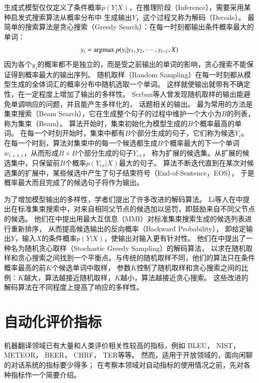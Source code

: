 生成式模型仅仅定义了条件概率$p(Y|X)$，在推理阶段（Inference），需要采用某种启发式搜索算法从概率分布中
生成输出$Y$，这个过程又称为解码（Decode）。
最简单的搜索算法是贪心搜索（Greedy Search）：在每一时刻都输出条件概率最大的单词：
\begin{align}
    y_i = \operatorname*{argmax} p(y_i|y_1, y_2, \cdots, y_{i-1}, X)
\end{align}
因为各个$y_i$的概率都不是独立的，而是受之前输出的单词的影响，贪心搜索不能保证得到概率最大的输出序列。
随机取样（Random Sampling）在每一时刻都从模型生成的全体词汇的概率分布中随机选取一个单词。
这样就使输出就带有不确定性，在一定程度上增加了输出的多样性。
Serban等人曾发现随机取样的输出能避免单调响应的问题，并且能产生多样化的，
话题相关的输出。
最为常用的方法是集束搜索（Beam Search），它在生成整个句子的过程中维护一个大小为$B$的列表，称为集束（Beam）。
算法开始时，集束初始化为模型生成的$B$个概率最高的单词。
在每一个时刻开始时，集束中都有$B$个部分生成的句子，它们称为候选$Y_c$。
在每一个时刻，算法对集束中的每一个候选都生成$B$个概率最大的下一个单词$w_{i+1, c}$，从而形成$B \times B$个部分生成的句子$Y_{ex}$，
称为扩展的候选集。从扩展的候选集中，只保留前$B$个概率$p(Y_{ex}|X)$最大的句子。
算法不断迭代直到在某次对候选集的扩展中，某些候选中产生了句子结束符号（End-of-Sentence，EOS），
于是概率最大而且完成了的候选句子将作为输出。

为了增加模型输出的多样性，学者们提出了许多改进的解码算法。
Li等人在\cite{DiverseBeam}中提出在标准集束搜索中，对来自相同父节点的候选加以惩罚，即鼓励来自不同父节点的候选。
他们在\cite{MMI}中提出用最大互信息（MMI）对标准集束搜索生成的候选列表进行重新排序，
从而提高候选输出的反向概率（Backward Probability），
即给定输出$Y$，输入$X$的条件概率$p(Y|X)$，使输出对输入更有针对性。
他们在\cite{Distill}中提出了一种名为随机贪心取样（Stochastic Greedy Sampling）的解码算法，
以求在随机取样和贪心搜索之间找到一个平衡点。与传统的随机取样不同，他们的算法只在条件概率最高的前$K$个候选单词中取样，
参数$K$控制了随机取样和贪心搜索之间的比例：$K$越大，算法越接近随机取样，$K$越小，算法越接近贪心搜索。
这些改进的解码算法在不同程度上提高了响应的多样性。

\section{自动化评价指标}\label{sec:automatic_metric}
机器翻译领域已有大量和人类评价相关性较高的指标，例如
BLEU，
NIST，
METEOR，
BEER，
CHRF，
TER等等。
然而，适用于开放领域的，面向闲聊的对话系统的指标要少得多；
在考察本领域对自动指标的使用情况之前，先对各种指标作一个简要介绍。

